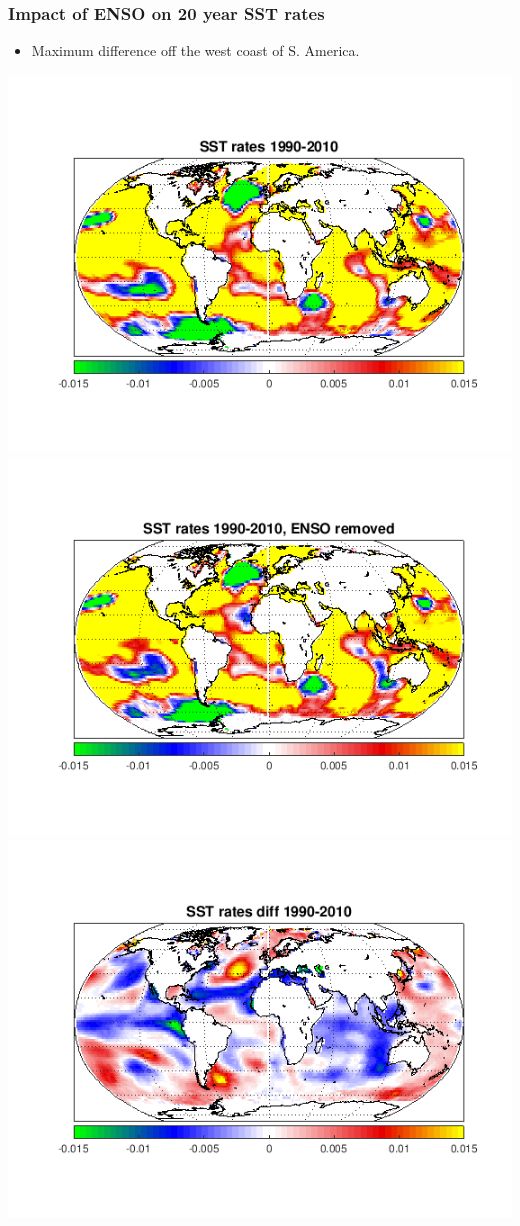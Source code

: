 \documentclass[10pt,t]{beamer}
\begin{document}
 \begin{frame}
  \frametitle{Impact of ENSO on 20 year SST rates}
 \begin{itemize}
    \item Maximum difference off the west coast of S. America. 
 \end{itemize}
    \centering
    \includegraphics[width=0.4\linewidth]{./figures/sst_rates_1990_2010.png}
    \includegraphics[width=0.4\linewidth]{./figures/sst_rates_1990_2010_enso_removed.png} \\ 
    \includegraphics[width=0.4\linewidth]{./sst_rates_diff_1990_2010.png}  
 \end{frame}
\end{document}
